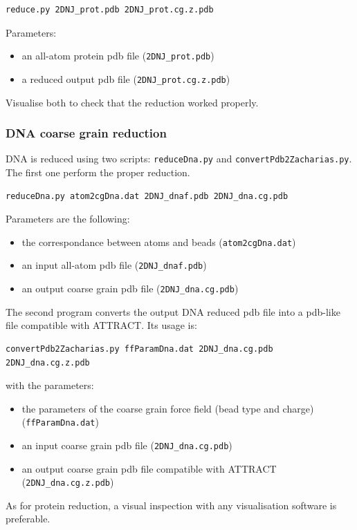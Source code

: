 \documentclass[12pt,a4paper]{article}
\begin{document}
\begin{verbatim}
reduce.py 2DNJ_prot.pdb 2DNJ_prot.cg.z.pdb
\end{verbatim}

Parameters:
\begin{itemize}
\item an all-atom protein pdb file ({\tt 2DNJ\_prot.pdb})
\item a reduced output pdb file ({\tt 2DNJ\_prot.cg.z.pdb})
\end{itemize}

Visualise both to check that the reduction worked properly.

\subsubsection{DNA coarse grain reduction}

DNA is reduced using two scripts: {\tt reduceDna.py} and {\tt convertPdb2Zacharias.py}. The first one perform the proper reduction.
\begin{verbatim}
reduceDna.py atom2cgDna.dat 2DNJ_dnaf.pdb 2DNJ_dna.cg.pdb
\end{verbatim}
Parameters are the following:
\begin{itemize}
\item the correspondance between atoms and beads ({\tt atom2cgDna.dat})
\item an input all-atom pdb file ({\tt 2DNJ\_dnaf.pdb})
\item an output coarse grain pdb file ({\tt 2DNJ\_dna.cg.pdb})
\end{itemize}

The second program converts the output DNA reduced pdb file into a pdb-like file compatible with ATTRACT. Its usage is:
\begin{verbatim}
convertPdb2Zacharias.py ffParamDna.dat 2DNJ_dna.cg.pdb 2DNJ_dna.cg.z.pdb
\end{verbatim}
with the parameters:
\begin{itemize}
\item the parameters of the coarse grain force field (bead type and charge) ({\tt ffParamDna.dat})
\item an input coarse grain pdb file ({\tt 2DNJ\_dna.cg.pdb})
\item an output coarse grain pdb file compatible with ATTRACT ({\tt 2DNJ\_dna.cg.z.pdb})
\end{itemize}

As for protein reduction, a visual inspection with any visualisation software is preferable.
\end{document}
